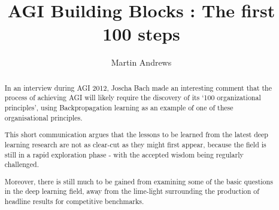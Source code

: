 \documentclass[citeauthoryear]{llncs}
\begin{document}
%
\frontmatter          %
%
\pagestyle{headings}  %
%
\mainmatter              %
%
\title{AGI Building Blocks : The first 100 steps}
%
%
\author{Martin Andrews}
%
%
%

\maketitle              %

\begin{abstract}



In an interview \cite{Joscha-Bach-2012-interview} during AGI 2012, 
Joscha Bach made an interesting comment that the process of achieving 
AGI will likely require the discovery of its `100 organizational principles', 
using Backpropagation learning as an example of one of these organisational principles.  

This short communication argues that the lessons to be learned from 
the latest deep learning research are not as clear-cut as they might first appear,
because the field is still in a rapid exploration phase - with the accepted wisdom 
being regularly challenged.

Moreover, there is still much to be gained from examining some of the 
basic questions in the deep learning field, away from the lime-light 
surrounding the production of headline results for competitive benchmarks.

\end{abstract}
%
\end{document}
